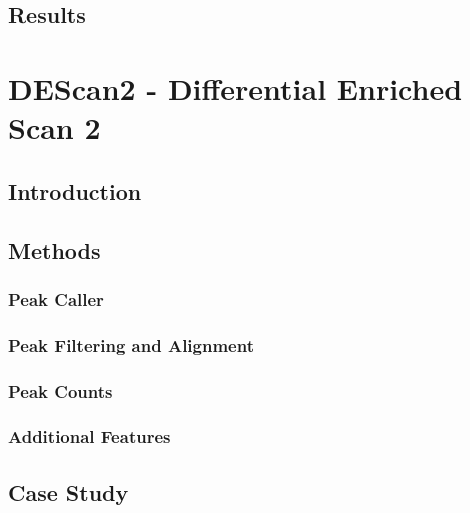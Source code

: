 \documentclass[b5paper,oneside,british,intoc,bibliograph=totoc,index=totoc,BCOR10mm,twoside,openright]{book}
\numberwithin{equation}{section}
\numberwithin{figure}{section}
\begin{document}
\section{Results}


\chapter{DEScan2 - Differential Enriched Scan 2} \label{sec:descan2cap}


\section{Introduction} \label{sec:descan2intro}


\section{Methods} \label{sec:descan2methods}


\subsection{Peak Caller} \label{sec:descan2peakcall}


\subsection{Peak Filtering and Alignment} \label{sec:descan2filtering}


\subsection{Peak Counts} \label{sec:descan2peakcounts}


\subsection{Additional Features} \label{sec:descan2addfeat}


\section{Case Study} \label{sec:descan2results}


\end{document}
